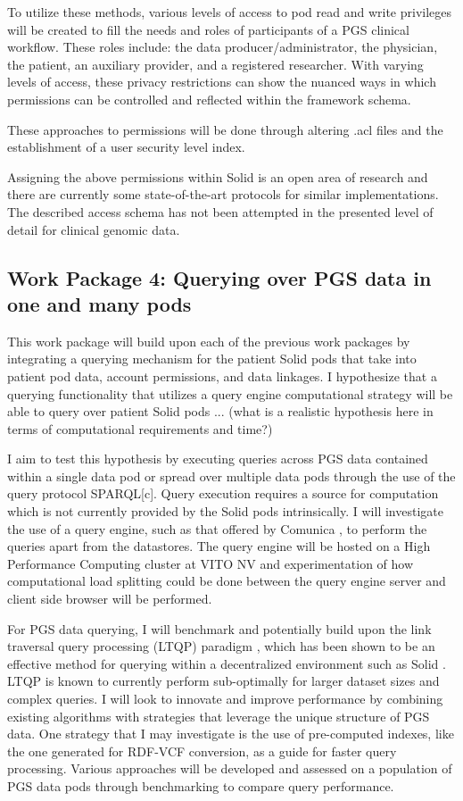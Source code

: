 \documentclass[runningheads]{llncs}
\begin{document}
To utilize these methods, various levels of access to pod read and write privileges will be created to fill the needs and roles of participants of a PGS clinical workflow. 
These roles include: the data producer/administrator, the physician, the patient, an auxiliary provider, and a registered researcher.
With varying levels of access, these privacy restrictions can show the nuanced ways in which permissions can be controlled and reflected within the framework schema.

These approaches to permissions will be done through altering .acl files and the establishment of a user security level index.

Assigning the above permissions within Solid is an open area of research and there are currently some state-of-the-art protocols for similar implementations. 
The described access schema has not been attempted in the presented level of detail for clinical genomic data.


\subsection{Work Package 4: Querying over PGS data in one and many pods}

This work package will build upon each of the previous work packages by integrating a querying mechanism for the patient Solid pods that take into patient pod data, account permissions, and data linkages. 
I hypothesize that a querying functionality that utilizes a query engine computational strategy will be able to query over patient Solid pods ... (what is a realistic hypothesis here in terms of computational requirements and time?)

I aim to test this hypothesis by executing queries across PGS data contained within a single data pod or spread over multiple data pods through the use of the query protocol SPARQL[c].  
Query execution requires a source for computation which is not currently provided by the Solid pods intrinsically.
I will investigate the use of a query engine, such as that offered by Comunica \cite{comunica}, to perform the queries apart from the datastores.
The query engine will be hosted on a High Performance Computing cluster at VITO NV and experimentation of how computational load splitting could be done between the query engine server and client side browser will be performed. 

For PGS data querying, I will benchmark and potentially build upon the link traversal query processing (LTQP) paradigm \cite{taelman_evaluation_2023}, which has been shown to be an effective method for querying within a decentralized environment such as Solid \cite{capadisli_solid_nodate}. 
LTQP is known to currently perform sub-optimally for larger dataset sizes and complex queries. 
I will look to innovate and improve performance by combining existing algorithms with strategies that leverage the unique structure of PGS data.
One strategy that I may investigate is the use of pre-computed indexes, like the one generated for RDF-VCF conversion, as a guide for faster query processing.
Various approaches will be developed and assessed on a population of PGS data pods through benchmarking to compare query performance. 
\end{document}
